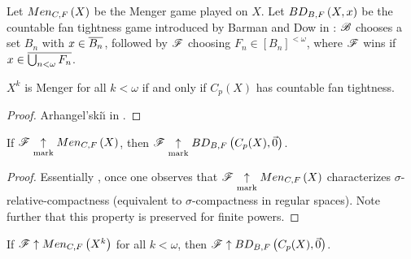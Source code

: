 \documentclass[11pt]{article}
\begin{document}
  \begin{definition}
    Let \(Men_{C,F}\left({X}\right)\) be the Menger game played on \(X\).
    Let \(BD_{B,F}\left({X},{x}\right)\) be the countable fan tightness
    game introduced by Barman and Dow in \cite{MR2678950}: \(\mathscr{B}\)
    chooses a set \(B_n\) with \(x\in\overline{B_n}\), followed by
    \(\mathscr{F}\) choosing \(F_n\in[B_n]^{<\omega}\), where \(\mathscr{F}\)
    wins if \(x\in\overline{\bigcup_{n<\omega} F_n}\).
  \end{definition}

  \begin{theorem}
    \(X^k\) is Menger for all \(k<\omega\) if and only if
    \(C_p(X)\) has countable fan tightness.
  \end{theorem}

  \begin{proof}
    Arhangel'ski{\u\i} in \cite{MR526012}.
  \end{proof}

  \begin{theorem}
    If \(\mathscr{F}\underset{\text{mark}}{\uparrow}Men_{C,F}\left({X}\right)\), then
    \(\mathscr{F}\underset{\text{mark}}{\uparrow}BD_{B,F}\left({C_p(X)},{\vec 0}\right)\).
  \end{theorem}

  \begin{proof}
    Essentially \cite[2.6]{MR2868880}, once one observes that
    \(\mathscr{F}\underset{\text{mark}}{\uparrow}Men_{C,F}\left({X}\right)\) characterizes
    \(\sigma\)-relative-compactness (equivalent to \(\sigma\)-compactness
    in regular spaces). Note further that this
    property is preserved for finite powers.
  \end{proof}

  \begin{theorem}
    If \(\mathscr{F}\uparrow Men_{C,F}\left({X^k}\right)\) for all \(k<\omega\), then
    \(\mathscr{F}\uparrow BD_{B,F}\left({C_p(X)},{\vec 0}\right)\).
  \end{theorem}
\end{document}
